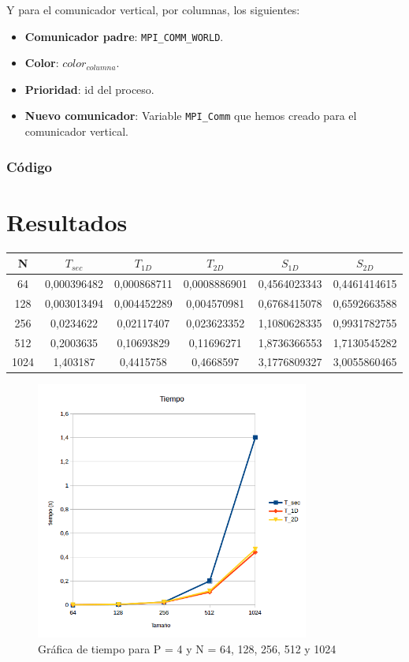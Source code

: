 Y para el comunicador vertical, por columnas, los siguientes:
\begin{itemize}
	\item \textbf{Comunicador padre}: \texttt{MPI\_COMM\_WORLD}.
	\item \textbf{Color}: $ color_{columna} $.
	\item \textbf{Prioridad}: id del proceso.
	\item \textbf{Nuevo comunicador}: Variable \texttt{MPI\_Comm} que hemos creado para el comunicador vertical.
\end{itemize}

\subsubsection{Código}



\section{Resultados}

\begin{tabular}{ | c | c c c | c c | }
	\hline
	N		&	$ T_{sec} $	&	$ T_{1D} $	&	$ T_{2D} $	 &	$ S_{1D} $	 &	$ S_{2D} $	\\
	\hline
	64      &	0,000396482 &	0,000868711 &	0,0008886901 &	0,4564023343 &	0,4461414615	\\
	128     &	0,003013494 &	0,004452289 &	0,004570981  &	0,6768415078 &	0,6592663588	\\
	256     &	0,0234622   &	0,02117407  &	0,023623352  &	1,1080628335 &	0,9931782755	\\
	512     &	0,2003635   &	0,10693829  &	0,11696271   &	1,8736366553 &	1,7130545282	\\
	1024    &	1,403187    &	0,4415758   &	0,4668597    &	3,1776809327 &	3,0055860465	\\
	\hline
\end{tabular}

\begin{figure}[H]
	\centering
	\includegraphics[width=9cm]{img/tiempo}
	\caption{Gráfica de tiempo para P = 4 y N = 64, 128, 256, 512 y 1024}
	\label{fig:grafica_tiempo}
\end{figure}

